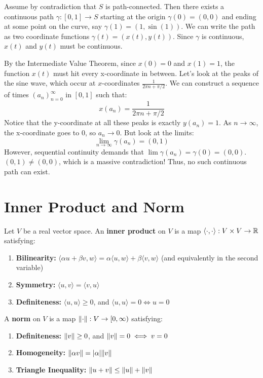 \begin{solution}
Assume by contradiction that $S$ is path-connected. Then there exists a continuous path $\gamma: [0,1] \to S$ starting at the origin $\gamma(0) = (0,0)$ and ending at some point on the curve, say $\gamma(1) = (1, \sin(1))$. 
We can write the path as two coordinate functions $\gamma(t) = (x(t), y(t))$. Since $\gamma$ is continuous, $x(t)$ and $y(t)$ must be continuous.

By the Intermediate Value Theorem, since $x(0) = 0$ and $x(1) = 1$, the function $x(t)$ must hit every x-coordinate in between. Let's look at the peaks of the sine wave, which occur at $x$-coordinates $\frac{1}{2\pi n + \pi/2}$. 
We can construct a sequence of times $(a_n)_{n=0}^\infty$ in $[0,1]$ such that:
\[ x(a_n) = \frac{1}{2\pi n + \pi/2} \]
Notice that the y-coordinate at all these peaks is exactly $y(a_n) = 1$. 
As $n \to \infty$, the x-coordinate goes to 0, so $a_n \to 0$. But look at the limits:
\[ \lim_{n \to \infty} \gamma(a_n) = (0, 1) \]
However, sequential continuity demands that $\lim \gamma(a_n) = \gamma(0) = (0,0)$. 
$(0,1) \ne (0,0)$, which is a massive contradiction! Thus, no such continuous path can exist.
\end{solution}

\hrulefill

\section{Inner Product and Norm}

\begin{definition*}
Let $V$ be a real vector space. An \textbf{inner product} on $V$ is a map $\langle \cdot, \cdot \rangle: V \times V \to \mathbb{R}$ satisfying:
\begin{enumerate}
    \item \textbf{Bilinearity:} $\langle \alpha u + \beta v, w \rangle = \alpha \langle u, w \rangle + \beta \langle v, w \rangle$ \textcolor{eGray}{(and equivalently in the second variable)}
    \item \textbf{Symmetry:} $\langle u, v \rangle = \langle v, u \rangle$
    \item \textbf{Definiteness:} $\langle u, u \rangle \ge 0$, and $\langle u, u \rangle = 0 \iff u = 0$
\end{enumerate}
\end{definition*}

\begin{definition*}[Norm]
A \textbf{norm} on $V$ is a map $\lVert\cdot\rVert: V \to [0, \infty)$ satisfying:
\begin{enumerate}
    \item \textbf{Definiteness:} $\lVert v\rVert \ge 0$, and $\lVert v\rVert = 0 \iff v = 0$
    \item \textbf{Homogeneity:} $\lVert\alpha v\rVert = \lvert\alpha\rvert \lVert v\rVert$
    \item \textbf{Triangle Inequality:} $\lVert u + v\rVert \le \lVert u\rVert + \lVert v\rVert$
\end{enumerate}
\end{definition*}

